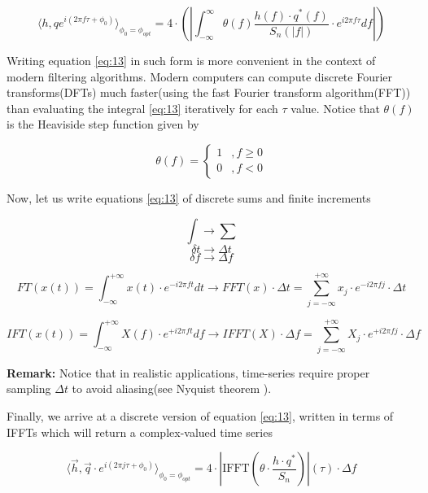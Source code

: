 \begin{equation}\label{eq:13}
\langle h,q e^{i(2\pi f \tau + \phi_0)} \rangle_{\phi_0=\phi_{opt}} =4\cdot \left( \left| \int_{-\infty}^{\infty} \theta(f)\frac{h(f) \cdot q^{*}(f) }{S_n(|f|)} \cdot e^{i 2\pi f \tau} df \right| \right)
\end{equation}


Writing equation \ref{eq:13} in such form is more convenient in the context of modern filtering algorithms. Modern computers can compute discrete Fourier transforms(DFTs) much faster(using the fast Fourier transform algorithm(FFT)) than evaluating the integral \ref{eq:13} iteratively for each $\tau$ value. Notice that $\theta(f)$ is the Heaviside step function given by

\begin{equation}\label{eq:14}
\theta(f) = \begin{cases}
 1 &, f \geq 0 \\
 0 &, f < 0
\end{cases}
\end{equation}

Now, let us write equations \ref{eq:13} of discrete sums and finite increments

$$\int \rightarrow \sum $$
$$ \delta t \rightarrow \Delta t$$ 
$$\delta f \rightarrow \Delta f$$

\begin{equation}
FT(x(t))=\int_{-\infty}^{+\infty} x(t)\cdot e^{-i2\pi f t} dt \rightarrow  FFT(x)\cdot \Delta t = \sum_{j=-\infty}^{+\infty} x_j \cdot e^{-i2\pi f j} \cdot \Delta t
\end{equation}

\begin{equation}
IFT(x(t))=\int_{-\infty}^{+\infty} X(f)\cdot e^{+i2\pi f t} df \rightarrow  IFFT(X)\cdot \Delta f = \sum_{j=-\infty}^{+\infty} X_j \cdot e^{+i2\pi f j} \cdot \Delta f
\end{equation}


\textbf{Remark:} Notice that in realistic applications, time-series require proper sampling $\Delta t$ to avoid aliasing(see Nyquist theorem \cite{5055024}). 

Finally, we arrive at a discrete version of equation \ref{eq:13}, written in terms of IFFTs which will return a complex-valued time series

\begin{equation}\label{eq:15}
\langle \vec{h} ,\vec{q} \cdot e^{i(2\pi j \tau + \phi_0)} \rangle_{\phi_0=\phi_{opt}} =4\cdot \left| \mathrm{IFFT}\left(  \theta \cdot \frac{h \cdot q^{*} }{S_n} \right)\right|(\tau) \cdot \Delta f
\end{equation}


